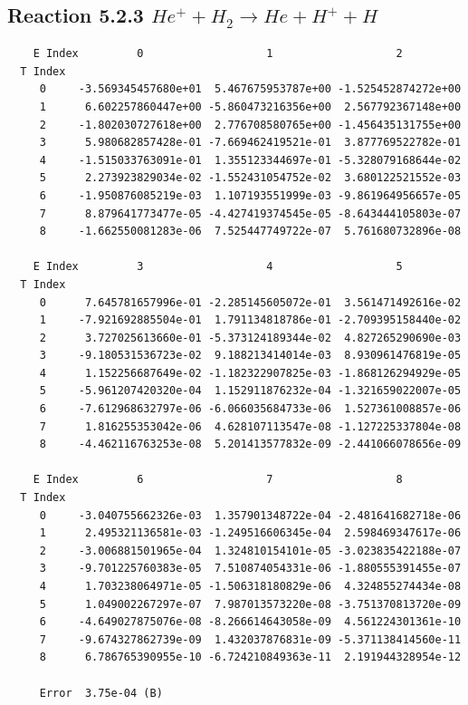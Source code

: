 \documentclass[12pt,dvipdfmx]{article}
\begin{document}
\newpage
\subsection{
Reaction 5.2.3 $   He^+ + H_2 \rightarrow He + H^+ + H$}


\begin{small}\begin{verbatim}
    E Index         0                   1                   2
  T Index
     0     -3.569345457680e+01  5.467675953787e+00 -1.525452874272e+00
     1      6.602257860447e+00 -5.860473216356e+00  2.567792367148e+00
     2     -1.802030727618e+00  2.776708580765e+00 -1.456435131755e+00
     3      5.980682857428e-01 -7.669462419521e-01  3.877769522782e-01
     4     -1.515033763091e-01  1.355123344697e-01 -5.328079168644e-02
     5      2.273923829034e-02 -1.552431054752e-02  3.680122521552e-03
     6     -1.950876085219e-03  1.107193551999e-03 -9.861964956657e-05
     7      8.879641773477e-05 -4.427419374545e-05 -8.643444105803e-07
     8     -1.662550081283e-06  7.525447749722e-07  5.761680732896e-08

    E Index         3                   4                   5
  T Index
     0      7.645781657996e-01 -2.285145605072e-01  3.561471492616e-02
     1     -7.921692885504e-01  1.791134818786e-01 -2.709395158440e-02
     2      3.727025613660e-01 -5.373124189344e-02  4.827265290690e-03
     3     -9.180531536723e-02  9.188213414014e-03  8.930961476819e-05
     4      1.152256687649e-02 -1.182322907825e-03 -1.868126294929e-05
     5     -5.961207420320e-04  1.152911876232e-04 -1.321659022007e-05
     6     -7.612968632797e-06 -6.066035684733e-06  1.527361008857e-06
     7      1.816255353042e-06  4.628107113547e-08 -1.127225337804e-08
     8     -4.462116763253e-08  5.201413577832e-09 -2.441066078656e-09

    E Index         6                   7                   8
  T Index
     0     -3.040755662326e-03  1.357901348722e-04 -2.481641682718e-06
     1      2.495321136581e-03 -1.249516606345e-04  2.598469347617e-06
     2     -3.006881501965e-04  1.324810154101e-05 -3.023835422188e-07
     3     -9.701225760383e-05  7.510874054331e-06 -1.880555391455e-07
     4      1.703238064971e-05 -1.506318180829e-06  4.324855274434e-08
     5      1.049002267297e-07  7.987013573220e-08 -3.751370813720e-09
     6     -4.649027875076e-08 -8.266614643058e-09  4.561224301361e-10
     7     -9.674327862739e-09  1.432037876831e-09 -5.371138414560e-11
     8      6.786765390955e-10 -6.724210849363e-11  2.191944328954e-12

     Error  3.75e-04 (B)
\end{verbatim}\end{small}
\end{document}
